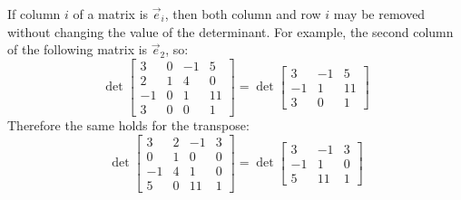 \begin{applicationActivities}{2}{26}
\begin{fact}
If column $i$ of a matrix is $\vec{e}_i$, then both column and row $i$
may be removed without changing the value of the determinant.
For example, the second column of the following matrix is \(\vec e_2\), so:
\[
  \det \begin{bmatrix}
    3 & 0 & -1 & 5 \\
    2 & 1 & 4 & 0 \\
    -1 & 0 & 1 & 11 \\
    3 & 0 & 0 & 1
  \end{bmatrix} =
  \det \begin{bmatrix}
    3 & -1 & 5 \\
    -1 & 1 & 11 \\
    3 & 0 & 1
  \end{bmatrix}
\]
Therefore the same holds for the transpose:
\[
  \det \begin{bmatrix}
    3 & 2 & -1 & 3 \\
    0 & 1 & 0 & 0 \\
    -1 & 4 & 1 & 0 \\
    5 & 0 & 11 & 1
  \end{bmatrix} =
  \det \begin{bmatrix}
    3 & -1 & 3 \\
    -1 & 1 & 0 \\
    5 & 11 & 1
  \end{bmatrix}
\]
\end{fact}


\end{applicationActivities}
